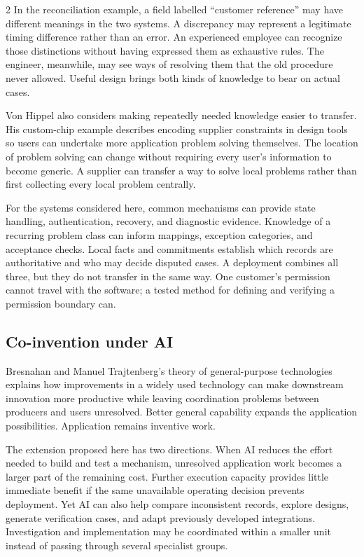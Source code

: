 \begin{multicols}{2}
In the reconciliation example, a field labelled ``customer reference''
may have different meanings in the two systems. A discrepancy may
represent a legitimate timing difference rather than an error. An
experienced employee can recognize those distinctions without having
expressed them as exhaustive rules. The engineer, meanwhile, may see
ways of resolving them that the old procedure never allowed. Useful
design brings both kinds of knowledge to bear on actual cases.

Von Hippel also considers making repeatedly needed knowledge easier to
transfer. His custom-chip example describes encoding supplier
constraints in design tools so users can undertake more application
problem solving themselves. The location of problem solving
\citep{vonhippel1994sticky} can change without requiring every user's
information to become generic. A supplier can transfer a way to solve
local problems rather than first collecting every local problem
centrally.

For the systems considered here, common mechanisms can provide state
handling, authentication, recovery, and diagnostic evidence. Knowledge
of a recurring problem class can inform mappings, exception categories,
and acceptance checks. Local facts and commitments establish which
records are authoritative and who may decide disputed cases. A
deployment combines all three, but they do not transfer in the same way.
One customer's permission cannot travel with the software; a tested
method for defining and verifying a permission boundary can.

\subsection{Co-invention under AI}\label{co-invention-under-ai}

Bresnahan and Manuel Trajtenberg's theory of general-purpose
technologies \citep{bresnahan1995gpt} explains how improvements in a
widely used technology can make downstream innovation more productive
while leaving coordination problems between producers and users
unresolved. Better general capability expands the application
possibilities. Application remains inventive work.

The extension proposed here has two directions. When AI reduces the
effort needed to build and test a mechanism, unresolved application work
becomes a larger part of the remaining cost. Further execution capacity
provides little immediate benefit if the same unavailable operating
decision prevents deployment. Yet AI can also help compare inconsistent
records, explore designs, generate verification cases, and adapt
previously developed integrations. Investigation and implementation may
be coordinated within a smaller unit instead of passing through several
specialist groups.


\end{multicols}
